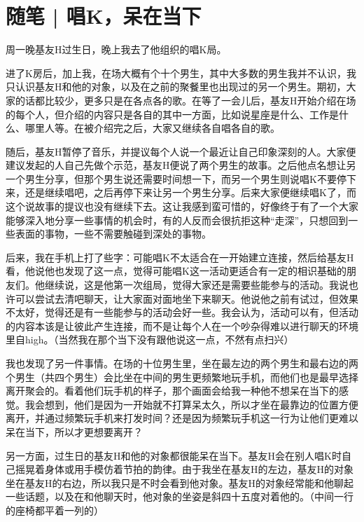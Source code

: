 \chapter{随笔 | 唱K，呆在当下}



周一晚基友H过生日，晚上我去了他组织的唱K局。

进了K房后，加上我，在场大概有个十个男生，其中大多数的男生我并不认识，我只认识基友H和他的对象，以及在之前的聚餐里也出现过的另一个男生。期初，大家的话都比较少，更多只是在各点各的歌。在等了一会儿后，基友H开始介绍在场的每个人，但介绍的内容只是各自的其中一方面，比如说星座是什么、工作是什么、哪里人等。在被介绍完之后，大家又继续各自唱各自的歌。

随后，基友H暂停了音乐，并提议每个人说一个最近让自己印象深刻的人。大家便建议发起的人自己先做个示范，基友H便说了两个男生的故事。之后他点名想让另一个男生分享，但那个男生说还需要时间想一下，而另一个男生则说唱K不要停下来，还是继续唱吧，之后再停下来让另一个男生分享。后来大家便继续唱K了，而这个说故事的提议也没有继续下去。这让我感到蛮可惜的，好像终于有了一个大家能够深入地分享一些事情的机会时，有的人反而会很抗拒这种“走深”，只想回到一些表面的事物，一些不需要触碰到深处的事物。

后来，我在手机上打了些字：可能唱K不太适合在一开始建立连接，然后给基友H看，他说他也发现了这一点，觉得可能唱K这一活动更适合有一定的相识基础的朋友们。他继续说，这是他第一次组局，觉得大家还是需要些能参与的活动。我说也许可以尝试去清吧聊天，让大家面对面地坐下来聊天。他说他之前有试过，但效果不太好，觉得还是有一些能参与的活动会好一些。我会认为，活动可以有，但活动的内容本该是让彼此产生连接，而不是让每个人在一个吵杂得难以进行聊天的环境里自high。（当然我在那个当下没有跟他说这一点，不然有点扫兴）

\tristarsepline

我也发现了另一件事情。在场的十位男生里，坐在最左边的两个男生和最右边的两个男生（共四个男生）会比坐在中间的男生更频繁地玩手机，而他们也是最早选择离开聚会的。看着他们玩手机的样子，那个画面会给我一种他不想呆在当下的感觉。我会想到，他们是因为一开始就不打算呆太久，所以才坐在最靠边的位置方便离开，并通过频繁玩手机来打发时间？还是因为频繁玩手机这一行为让他们更难以呆在当下，所以才更想要离开？

另一方面，过生日的基友H和他的对象都很能呆在当下。基友H会在别人唱K时自己摇晃着身体或用手模仿着节拍的韵律。由于我坐在基友H的左边，基友H的对象坐在基友H的右边，所以我只是不时会看到他对象。基友H的对象经常能和他聊起一些话题，以及在和他聊天时，他对象的坐姿是斜四十五度对着他的。（中间一行的座椅都平着一列的）

